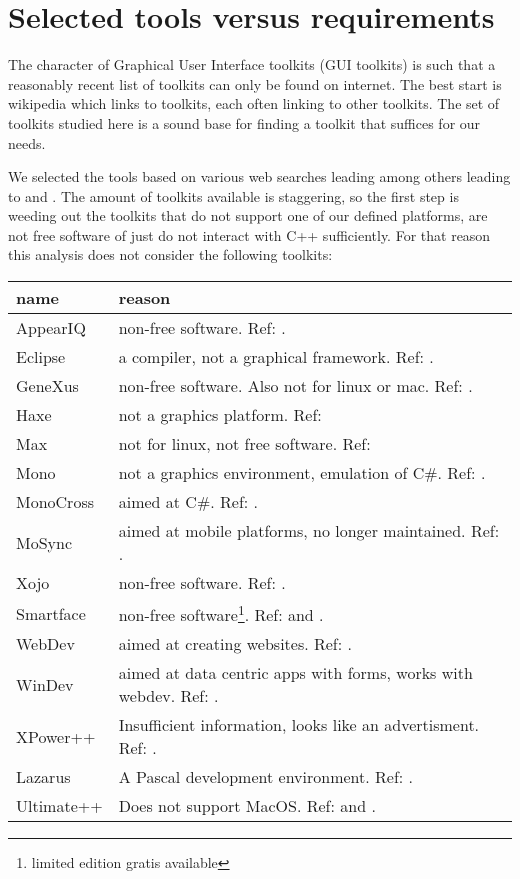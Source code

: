 \section{Selected tools versus requirements}

The character of Graphical User Interface toolkits (GUI toolkits) is such that
a reasonably recent list of toolkits can only be found on internet. The best
start is wikipedia which links to toolkits, each often linking to other
toolkits. The set of toolkits studied here is a sound base for finding a
toolkit that suffices for our needs.

We selected the tools based on various web searches leading among others
leading to \cite{wiki:xplatf} and \cite{wiki:xplatf_gui}.  The amount of
toolkits available is staggering, so the first step is weeding out the toolkits
that do not support one of our defined platforms, are not free software of just
do not interact with C++ sufficiently.  For that reason this analysis does not
consider the following toolkits:

\begin{center}
    \begin{tabular}{|p{7em}|p{25em}|}
	\hline
	{\bf name} & {\bf reason}\\\hline
	AppearIQ & non-free software. Ref: \cite{appear:appeariq}.\\
	Eclipse & a compiler, not a graphical framework. Ref: \cite{wiki:eclipse}.\\
	GeneXus & non-free software. Also not for linux
		    or mac. Ref: \cite{wiki:genexus}. \\
	Haxe & not a graphics platform. Ref: \cite{wiki:haxe}\\
	Max & not for linux, not free software. Ref: \cite{wiki:max}\\
	Mono & not a graphics environment, emulation
		of C\#. Ref: \cite{wiki:mono}.\\
	MonoCross & aimed at C\#. Ref: \cite{wiki:monocross}.\\
	MoSync & aimed at mobile platforms, no longer maintained. Ref: \cite{wiki:mosync}.\\
	Xojo & non-free software. Ref: \cite{wiki:xojo}.\\
	Smartface & non-free software\footnote{limited edition gratis available}. Ref: \cite{wiki:smartface} and \cite{smartface:license}.\\
	WebDev & aimed at creating websites. Ref: \cite{wiki:webdev}.\\
	WinDev & aimed at data centric apps with forms, works with webdev. Ref: \cite{wiki:windev}.\\
	XPower++ & Insufficient information, looks like an advertisment. Ref: \cite{wiki:xpower++}.\\
	Lazarus & A Pascal development environment. Ref: \cite{wiki:lazarus}.\\
	Ultimate++ & Does not support MacOS. Ref: \cite{wiki:ultimate++} and \cite{wxwidget:comparison}.\\
	\hline
    \end{tabular}
	\label{tab: discarded-toolkits}
\end{center}

